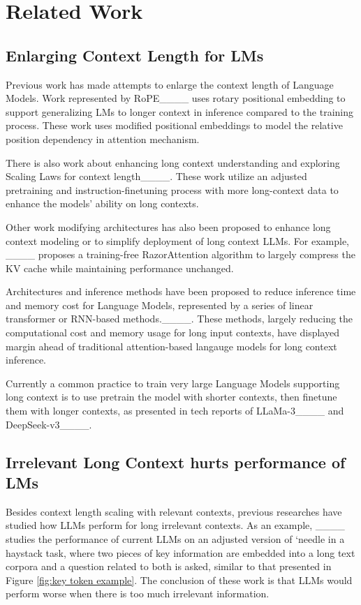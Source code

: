 \section{Related Work}
\subsection{Enlarging Context Length for LMs}

Previous work has made attempts to enlarge the context length of Language Models. Work represented by RoPE____ uses rotary positional embedding to support generalizing LMs to longer context in inference compared to the training process. These work uses modified positional embeddings to model the relative position dependency in attention mechanism.

There is also work about enhancing long context understanding and exploring Scaling Laws for context length____. These work utilize an adjusted pretraining and instruction-finetuning process with more long-context data to enhance the models' ability on long contexts.

Other work modifying architectures has also been proposed to enhance long context modeling or to simplify deployment of long context LLMs. For example, ____ proposes a training-free RazorAttention algorithm to largely compress the KV cache while maintaining performance unchanged.

Architectures and inference methods have been proposed to reduce inference time and memory cost for Language Models, represented by a series of linear transformer or RNN-based methods.____. These methods, largely reducing the computational cost and memory usage for long input contexts, have displayed margin ahead of traditional attention-based langauge models for long context inference.


Currently a common practice to train very large Language Models supporting long context is to use pretrain the model with shorter contexts, then finetune them with longer contexts, as presented in tech reports of LLaMa-3____ and DeepSeek-v3____.

\subsection{Irrelevant Long Context hurts performance of LMs}

Besides context length scaling with relevant contexts, previous researches have studied how LLMs perform for long irrelevant contexts. As an example, ____ studies the performance of current LLMs on an adjusted version of `needle in a haystack task, where two pieces of key information are embedded into a long text corpora and a question related to both is asked, similar to that presented in Figure \ref{fig:key token example}. The conclusion of these work is that LLMs would perform worse when there is too much irrelevant information.

